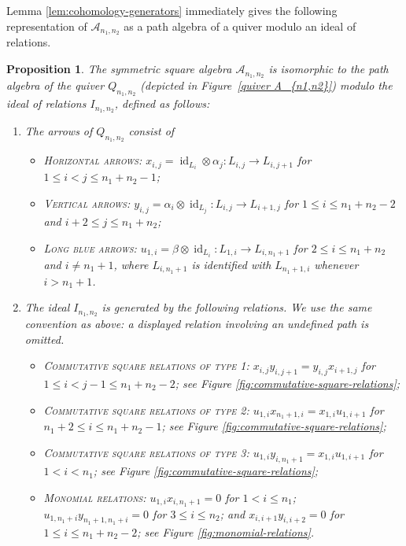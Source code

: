 \documentclass[a4paper, reqno, 11pt]{amsart}
\newtheorem{prop}[theorem]{Proposition}
\theoremstyle{definition}
\begin{document}
Lemma \ref{lem:cohomology-generators} immediately gives the following representation of
\(\mathcal A_{n_1,n_2}\) as a path algebra of a quiver modulo an ideal of
relations.

\begin{prop}\label{prop:cohomologysymsqu}
	The symmetric square algebra $\mathcal{A}_{n_1,n_2}$ is isomorphic to the path algebra of the quiver $Q_{n_1,n_2}$ (depicted in Figure~\ref{quiver A_{n1,n2}}) modulo the ideal of relations $I_{n_1,n_2}$, defined as follows:
	\begin{enumerate}[label=(\arabic*), leftmargin=*]
		\item The arrows of $Q_{n_1,n_2}$ consist of
		\begin{itemize}[label=--]
			\item \textsc{Horizontal arrows}: 
			\(
			x_{i,j}= \operatorname{id}_{L_i} \otimes \alpha_j 
			\colon L_{i,j} \longrightarrow L_{i,j+1}
			\) for \(1\leq i<j\leq n_1+n_2-1\);
			\item \textsc{Vertical arrows}: 
			\(
			y_{i,j}= \alpha_i \otimes \operatorname{id}_{L_j} 
			\colon  L_{i,j} \longrightarrow L_{i+1,j}
			\) for \(1\leq i\leq n_1+n_2-2\) and \(i+2\leq j\leq n_1+n_2\);
			\item \textsc{Long blue arrows}: 
			\(
			u_{1,i}= \beta \otimes \operatorname{id}_{L_i} 
			\colon L_{1,i} \longrightarrow L_{i,n_1+1}
			\) for \(2\leq i\leq n_1+n_2\) and \(i\neq n_1+1\), where \(L_{i,n_1+1}\) is identified with \(L_{n_1+1,i}\) whenever \(i>n_1+1\).
		\end{itemize}
		
		\item The ideal $I_{n_1,n_2}$ is generated by the following relations. We use the same convention as above: a displayed relation involving an undefined path is omitted.
		\begin{itemize}[label=--]
			\item \textsc{Commutative square relations of type 1}: $x_{i,j} y_{i,j+1} = y_{i,j} x_{i+1,j}$ for $1\leq i<j-1 \leq n_1+n_2-2$; see Figure \ref{fig:commutative-square-relations};
			\item \textsc{Commutative square relations of type 2}: $u_{1,i} x_{n_1+1,i}=x_{1,i} u_{1,i+1}$ for $n_1+2\leq i\leq  n_1+n_2-1$; see Figure \ref{fig:commutative-square-relations};
			\item \textsc{Commutative square relations of type 3}: $u_{1,i} y_{i,n_1+1}=x_{1,i}u_{1,i+1}$ for $1<i<n_1$; see Figure \ref{fig:commutative-square-relations};
			\item \textsc{Monomial relations}: $u_{1,i} x_{i,n_1+1}=0$ for $1< i\leq n_1$; $u_{1,n_1+i} y_{n_1+1,n_1+i}=0$ for $3\leq i \leq n_2$; and $x_{i,i+1} y_{i,i+2} = 0$ for $1\leq i \leq n_1+n_2-2$; see Figure \ref{fig:monomial-relations}.
		\end{itemize}
	\end{enumerate}
	

\end{prop}
\end{document}
